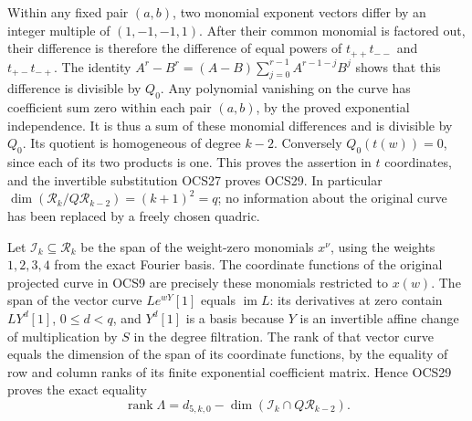 \documentclass[11pt,a4paper]{article}
\begin{document}
Within any fixed pair $(a,b)$, two monomial exponent vectors
differ by an integer multiple of $(1,-1,-1,1)$. After their
common monomial is factored out, their difference is therefore
the difference of equal powers of $t_{++}t_{--}$ and
$t_{+-}t_{-+}$. The identity
$A^r-B^r=(A-B)\sum_{j=0}^{r-1}A^{r-1-j}B^j$ shows that
this difference is divisible by $Q_0$. Any polynomial
vanishing on the curve has coefficient sum zero within
each pair $(a,b)$, by the proved exponential independence.
It is thus a sum of these monomial differences and is
divisible by $Q_0$. Its quotient is homogeneous of degree
$k-2$. Conversely $Q_0(t(w))=0$, since each of its two
products is one. This proves the assertion in $t$
coordinates, and the invertible substitution OCS27 proves
OCS29. In particular
$\dim(\mathcal R_k/Q\mathcal R_{k-2})=(k+1)^2=q$;
no information about the original curve has been replaced
by a freely chosen quadric.

Let $\mathcal I_k\subseteq\mathcal R_k$ be the span of the
weight-zero monomials $x^\nu$, using the weights $1,2,3,4$
from the exact Fourier basis. The coordinate functions of
the original projected curve in OCS9 are precisely these
monomials restricted to $x(w)$. The span of the vector
curve $Le^{wY}[1]$ equals $\operatorname{im}L$: its
derivatives at zero contain $LY^d[1]$, $0\leq d<q$, and
$Y^d[1]$ is a basis because $Y$ is an invertible affine
change of multiplication by $S$ in the degree filtration.
The rank of that vector curve equals the dimension of
the span of its coordinate functions, by the equality of
row and column ranks of its finite exponential coefficient
matrix. Hence OCS29 proves the exact equality
\[
 \operatorname{rank}\Lambda
   =d_{5,k,0}-\dim(\mathcal I_k\cap Q\mathcal R_{k-2}).
 \tag{OCS30}
\]
\end{document}
